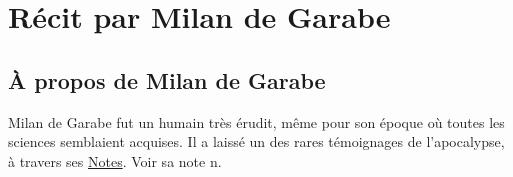 \section{Récit par Milan de Garabe}
\subsection{À propos de Milan de Garabe}
Milan de Garabe fut un humain très érudit, même pour son époque où toutes les sciences semblaient acquises. Il a laissé un des rares témoignages de l'apocalypse, à travers ses \underline{Notes}. Voir sa note n.